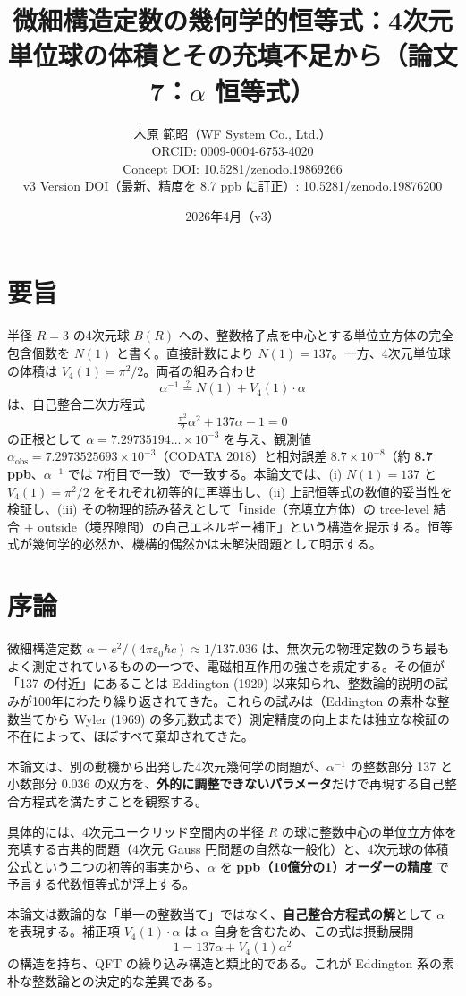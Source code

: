 \documentclass[a4paper,11pt]{ltjsarticle}
\title{微細構造定数の幾何学的恒等式：4次元単位球の体積とその充填不足から（論文7：$\alpha$ 恒等式）}
\author{木原 範昭（WF System Co., Ltd.）\\ ORCID: \href{https://orcid.org/0009-0004-6753-4020}{0009-0004-6753-4020} \\ Concept DOI: \href{https://doi.org/10.5281/zenodo.19869266}{10.5281/zenodo.19869266} \\ v3 Version DOI（最新、精度を 8.7 ppb に訂正）: \href{https://doi.org/10.5281/zenodo.19876200}{10.5281/zenodo.19876200}}
\date{2026年4月（v3）}
\begin{document}
\maketitle

\section*{要旨}

半径 $R = 3$ の4次元球 $B(R)$ への、整数格子点を中心とする単位立方体の完全包含個数を $N(1)$ と書く。直接計数により $N(1) = 137$。一方、4次元単位球の体積は $V_4(1) = \pi^2/2$。両者の組み合わせ
\[ \alpha^{-1} \stackrel{?}{=} N(1) + V_4(1) \cdot \alpha \]
は、自己整合二次方程式
\[ \tfrac{\pi^2}{2}\alpha^2 + 137 \alpha - 1 = 0 \]
の正根として $\alpha = 7.29735194\ldots \times 10^{-3}$ を与え、観測値 $\alpha_{\text{obs}} = 7.2973525693 \times 10^{-3}$（CODATA 2018）と相対誤差 $8.7 \times 10^{-8}$（約 \textbf{8.7 ppb}、$\alpha^{-1}$ では 7桁目で一致）で一致する。本論文では、(i) $N(1) = 137$ と $V_4(1) = \pi^2/2$ をそれぞれ初等的に再導出し、(ii) 上記恒等式の数値的妥当性を検証し、(iii) その物理的読み替えとして「inside（充填立方体）の tree-level 結合 + outside（境界隙間）の自己エネルギー補正」という構造を提示する。恒等式が幾何学的必然か、機構的偶然かは未解決問題として明示する。

\section{序論}

微細構造定数 $\alpha = e^2/(4\pi\varepsilon_0 \hbar c) \approx 1/137.036$ は、無次元の物理定数のうち最もよく測定されているものの一つで、電磁相互作用の強さを規定する。その値が「137 の付近」にあることは Eddington (1929) 以来知られ、整数論的説明の試みが100年にわたり繰り返されてきた。これらの試みは（Eddington の素朴な整数当てから Wyler (1969) の多元数式まで）測定精度の向上または独立な検証の不在によって、ほぼすべて棄却されてきた。

本論文は、別の動機から出発した4次元幾何学の問題が、$\alpha^{-1}$ の整数部分 137 と小数部分 0.036 の双方を、\textbf{外的に調整できないパラメータ}だけで再現する自己整合方程式を満たすことを観察する。

具体的には、4次元ユークリッド空間内の半径 $R$ の球に整数中心の単位立方体を充填する古典的問題（4次元 Gauss 円問題の自然な一般化）と、4次元球の体積公式という二つの初等的事実から、$\alpha$ を \textbf{ppb（10億分の1）オーダーの精度} で予言する代数恒等式が浮上する。

本論文は数論的な「単一の整数当て」ではなく、\textbf{自己整合方程式の解}として $\alpha$ を表現する。補正項 $V_4(1) \cdot \alpha$ は $\alpha$ 自身を含むため、この式は摂動展開
\[ 1 = 137 \alpha + V_4(1) \alpha^2 \]
の構造を持ち、QFT の繰り込み構造と類比的である。これが Eddington 系の素朴な整数論との決定的な差異である。
\end{document}
